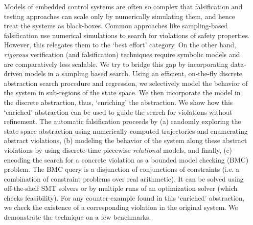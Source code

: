 Models of embedded control systems are often so complex that
falsification and testing approaches can scale only by numerically
simulating them, and hence treat the systems as black-boxes. Common
approaches like sampling-based falsification use numerical simulations
to search for violations of safety properties. However, this relegates
them to the `best effort' category. On the other hand, \emph{rigorous}
verification (and falsification) techniques require symbolic models
and are comparatively less scalable. We try to bridge this gap by
incorporating data-driven models in a sampling based search. Using an
efficient, on-the-fly discrete abstraction search procedure and
regression, we selectively model the behavior of the system in
sub-regions of the state space. We then incorporate the model in the
discrete abstraction, thus, `enriching' the abstraction. We show how
this `enriched' abstraction can be used to guide the search for
violations without refinement.  The automatic falsification proceeds
by (a) randomly exploring the state-space abstraction using
numerically computed trajectories and enumerating abstract violations,
(b) modeling the behavior of the system along these abstract
violations by using discrete-time piecewise \emph{relational} models,
and finally, (c) encoding the search for a concrete violation as a
bounded model checking (BMC) problem.  The BMC query is a disjunction
of conjunctions of constraints (i.e. a combination of constraint
problems over real arithmetic). It can be solved using off-the-shelf
SMT solvers or by multiple runs of an optimization solver (which
checks feasibility). For any counter-example found in this `enriched'
abstraction, we check the existence of a corresponding violation in
the original system. We demonstrate the technique on a few benchmarks.




